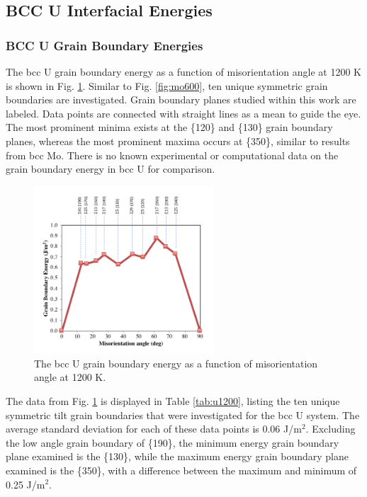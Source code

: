 \documentclass[review]{elsarticle}
\begin{document}
\FloatBarrier



\subsection{BCC U Interfacial Energies}
\subsubsection{BCC U Grain Boundary Energies}

The bcc U grain boundary energy as a function of misorientation angle at 1200 K is shown in Fig. \ref{fig:u1200}. Similar to Fig. \ref{fig:mo600}, ten unique symmetric grain boundaries are investigated. Grain boundary planes studied within this work are labeled. Data points are connected with straight lines as a mean to guide the eye. The most prominent minima exists at the \{120\} and \{130\} grain boundary planes, whereas the most prominent maxima occurs at \{350\}, similar to results from bcc Mo. There is no known experimental or computational data on the grain boundary energy in bcc U for comparison.

\begin{figure}[h]
 \centering
 \includegraphics[width=0.6\textwidth]{u1200B.png} 
 \caption{The bcc U grain boundary energy as a function of misorientation angle at 1200 K.}
 \label{fig:u1200}
\end{figure}

The data from Fig. \ref{fig:u1200} is displayed in Table \ref{tab:u1200}, listing the ten unique symmetric tilt grain boundaries that were investigated for the bcc U system. The average standard deviation for each of these data points is 0.06 J/m$^{2}$. Excluding the low angle grain boundary of \{190\}, the minimum energy grain boundary plane examined is the \{130\}, while the maximum energy grain boundary plane examined is the \{350\}, with a difference between the maximum and minimum of 0.25 J/m$^{2}$. 
\end{document}
